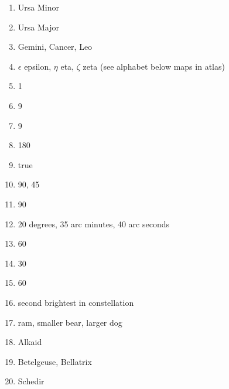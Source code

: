 \begin{enumerate} 

\item 
Ursa Minor

\item
Ursa Major

\item
Gemini, Cancer, Leo

\item
$\epsilon$ epsilon, $\eta$ eta, $\zeta$ zeta (see alphabet below maps in atlas)

\item
1\deg

\item
9

\item
9

\item
180

\item
true

\item
90\deg, 45\deg

\item
90\deg

\item
20  degrees, 35 arc minutes, 40 arc seconds

\item
60

\item
30

\item
60

\item
second brightest in constellation

\item 
ram, smaller bear, larger dog

\item 
Alkaid

\item 
Betelgeuse, Bellatrix 

\item 
Schedir

\end{enumerate} 













